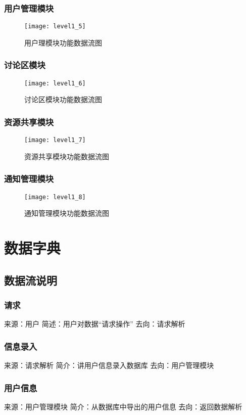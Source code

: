 \subsubsection{用户管理模块}
\begin{figure}[H]
\centering
\texttt{[image: level1\_5]}
\caption{用户理模块功能数据流图}
\end{figure}
\subsubsection{讨论区模块}
\begin{figure}[H]
\centering
\texttt{[image: level1\_6]}
\caption{讨论区模块功能数据流图}
\end{figure}
\subsubsection{资源共享模块}
\begin{figure}[H]
\centering
\texttt{[image: level1\_7]}
\caption{资源共享模块功能数据流图}
\end{figure}
\subsubsection{通知管理模块}
\begin{figure}[H]
\centering
\texttt{[image: level1\_8]}
\caption{通知管理模块功能数据流图}
\end{figure}

\section{数据字典}
\subsection{数据流说明}
\subsubsection{请求}
来源：用户
简述：用户对数据“请求操作”
去向：请求解析

\subsubsection{信息录入}
来源：请求解析
简介：讲用户信息录入数据库
去向：用户管理模块

\subsubsection{用户信息}
来源：用户管理模块
简介：从数据库中导出的用户信息
去向：返回数据解析

